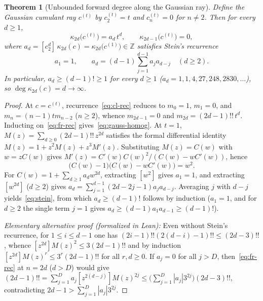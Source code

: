 \documentclass[11pt,a4paper]{article}
\newtheorem{theorem}{Theorem}[section]
\theoremstyle{definition}
\theoremstyle{remark}
\newcommand{\Z}{\mathbb{Z}}
\begin{document}
\begin{theorem}[Unbounded forward degree along the Gaussian ray]\label{thm:gauss-degree}
Define the Gaussian cumulant ray $c^{(t)}$ by $c^{(t)}_2 = t$ and $c^{(t)}_n = 0$ for $n \ne 2$. Then for every $d \ge 1$,
\begin{equation}\label{eq:gauss-homog}
  \kappa_{2d}\bigl(c^{(t)}\bigr) = a_d \, t^d, \qquad \kappa_{2d-1}\bigl(c^{(t)}\bigr) = 0,
\end{equation}
where $a_d = [c_2^d]\,\kappa_{2d}(c) = \kappa_{2d}\bigl(c^{(1)}\bigr) \in \Z$ satisfies Stein's recurrence~\cite{Stein1978}
\begin{equation}\label{eq:stein}
  a_1 = 1, \qquad a_d = (d - 1)\sum_{j=1}^{d-1} a_j a_{d-j} \quad (d \ge 2).
\end{equation}
In particular, $a_d \ge (d-1)! \ge 1$ for every $d \ge 1$ ($a_d = 1, 1, 4, 27, 248, 2830, \dots$), so $\deg \kappa_{2d}(c) = d \to \infty$.
\end{theorem}

\begin{proof}
At $c = c^{(t)}$, recurrence~\eqref{eq:cl-rec} reduces to $m_0 = 1$, $m_1 = 0$, and $m_n = (n-1) t m_{n-2}$ ($n \ge 2$), whence $m_{2d-1} = 0$ and $m_{2d} = (2d-1)!!\, t^d$. Inducting on~\eqref{eq:fr-rec} gives~\eqref{eq:gauss-homog}. At $t = 1$, $M(z) = \sum_{d \ge 0} (2d-1)!!\, z^{2d}$ satisfies the formal differential identity $M(z) = 1 + z^2 M(z) + z^3 M'(z)$. Substituting $M(z) = C(w)$ with $w = z C(w)$ gives $M'(z) = C'(w) C(w)^2 / (C(w) - w C'(w))$, hence
\[
  \bigl(C(w) - 1\bigr)\bigl(C(w) - w C'(w)\bigr) = w^2.
\]
For $C(w) = 1 + \sum_{d \ge 1} a_d w^{2d}$, extracting $[w^2]$ gives $a_1 = 1$, and extracting $[w^{2d}]$ ($d \ge 2$) gives $a_d = \sum_{j=1}^{d-1}(2d - 2j - 1)a_j a_{d-j}$. Averaging $j$ with $d - j$ yields~\eqref{eq:stein}, from which $a_d \ge (d-1)!$ follows by induction ($a_1 = 1$, and for $d \ge 2$ the single term $j = 1$ gives $a_d \ge (d-1) a_1 a_{d-1} \ge (d-1)!$).

\emph{Elementary alternative proof (formalized in Lean):} Even without Stein's recurrence, for $1 \le i \le d - 1$ one has $(2i-1)!!(2(d-i)-1)!! \le (2d-3)!!$, whence $[z^{2d}]M(z)^2 \le 3(2d-1)!!$ and by induction $[z^{2d}]M(z)^r \le 3^r (2d-1)!!$ for all $r,d \ge 0$. If $a_j = 0$ for all $j > D$, then~\eqref{eq:fr-rec} at $n = 2d$ ($d > D$) would give $(2d-1)!! = \sum_{j=1}^D a_j [z^{2(d-j)}]M(z)^{2j} \le \bigl(\sum_{j=1}^D |a_j| 3^{2j}\bigr)(2d-3)!!$, contradicting $2d - 1 > \sum_{j=1}^D |a_j| 3^{2j}$.
\end{proof}
\end{document}
